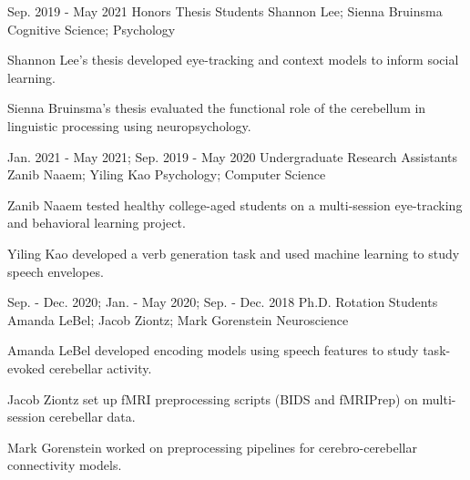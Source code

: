 

\begin{cventries}

 
  \cventry
    {Sep. 2019 - May 2021} %
    {Honors Thesis Students} %
    {Shannon Lee; Sienna Bruinsma} 
    {Cognitive Science; Psychology} %
    {
      \begin{cvitems} %
        \item {Shannon Lee's thesis developed eye-tracking and context models to inform social learning.}
        \item {Sienna Bruinsma's thesis evaluated the functional role of the cerebellum in linguistic processing using neuropsychology.}
      \end{cvitems}
    }
    
    
  \cventry
    {Jan. 2021 - May 2021; Sep. 2019 - May 2020} %
    {Undergraduate Research Assistants} %
   	{Zanib Naaem; Yiling Kao}
   	{Psychology; Computer Science}
    {
      \begin{cvitems} %
        \item {Zanib Naaem tested healthy college-aged students on a multi-session eye-tracking and behavioral learning project.}
        \item {Yiling Kao developed a verb generation task and used machine learning to study speech envelopes.}
      \end{cvitems}
    }
    
  \cventry
    {Sep. - Dec. 2020; Jan. - May 2020; Sep. - Dec. 2018} %
    {Ph.D. Rotation Students} %
    {Amanda LeBel; Jacob Ziontz; Mark Gorenstein}
    {Neuroscience}
   {
      \begin{cvitems} %
        \item {Amanda LeBel developed encoding models using speech features to study task-evoked cerebellar activity.}
        \item {Jacob Ziontz set up fMRI preprocessing scripts (BIDS and fMRIPrep) on multi-session cerebellar data.}
        \item {Mark Gorenstein worked on preprocessing pipelines for cerebro-cerebellar connectivity models.}
      \end{cvitems}
    }
    

\end{cventries}

